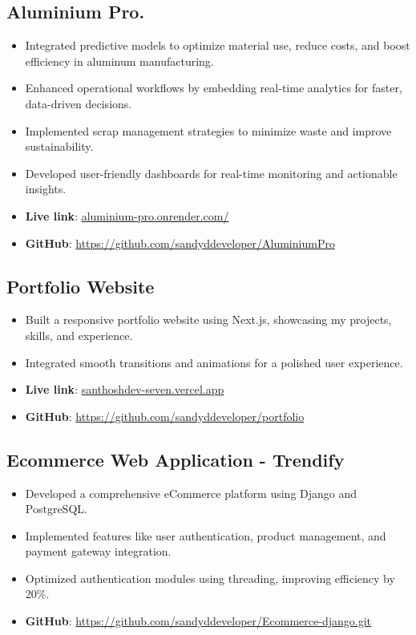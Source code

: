 \documentclass[11pt]{article}
\begin{document}
\subsection{Aluminium Pro.} 
\begin{itemize}
    \item Integrated predictive models to optimize material use, reduce costs, and boost efficiency in aluminum manufacturing.
    \item Enhanced operational workflows by embedding real-time analytics for faster, data-driven decisions.
    \item Implemented scrap management strategies to minimize waste and improve sustainability.
    \item Developed user-friendly dashboards for real-time monitoring and actionable insights.
    \item \textbf{Live link}: \href{https://aluminium-pro.onrender.com/}{aluminium-pro.onrender.com/}
    \item \textbf{GitHub}: \href{https://github.com/sandyddeveloper/AluminiumPro}{https://github.com/sandyddeveloper/AluminiumPro}
\end{itemize}
\subsection{Portfolio Website} 
\begin{itemize}
    \item Built a responsive portfolio website using Next.js, showcasing my projects, skills, and experience.
    \item Integrated smooth transitions and animations for a polished user experience.
    \item \textbf{Live link}: \href{https://santhoshdev-seven.vercel.app/}{santhoshdev-seven.vercel.app}
    \item \textbf{GitHub}: \href{https://github.com/sandyddeveloper/portfolio}{https://github.com/sandyddeveloper/portfolio}
\end{itemize}

\subsection{Ecommerce Web Application - Trendify}
\begin{itemize}
    \item Developed a comprehensive eCommerce platform using Django and PostgreSQL.
    \item Implemented features like user authentication, product management, and payment gateway integration.
    \item Optimized authentication modules using threading, improving efficiency by 20\%.
    \item \textbf{GitHub}: \href{https://github.com/sandyddeveloper/Ecommerce-django.git}{https://github.com/sandyddeveloper/Ecommerce-django.git}
\end{itemize}
\end{document}
